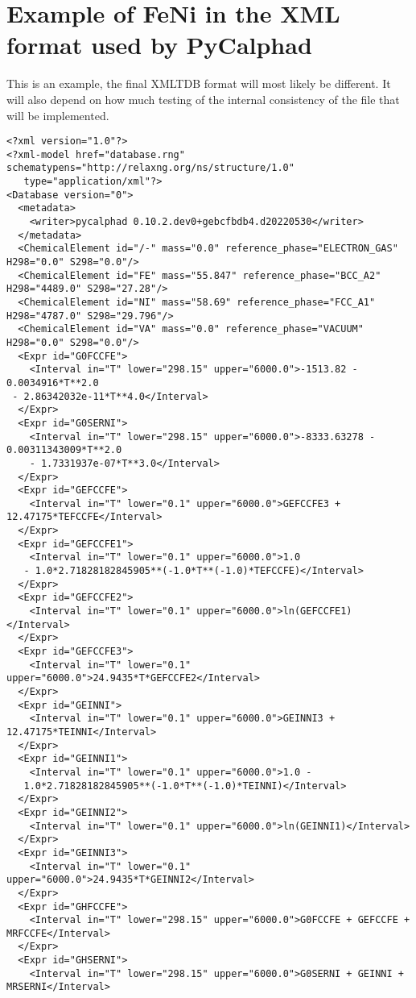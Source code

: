 \documentclass[12pt]{article}
\begin{document}
\section{Example of FeNi in the XML format used by PyCalphad}\label{sc:fenixml}

This is an example, the final XMLTDB format will most likely be
different.  It will also depend on how much testing of the internal
consistency of the file that will be implemented.

{\small
\begin{verbatim}
<?xml version="1.0"?>
<?xml-model href="database.rng" schematypens="http://relaxng.org/ns/structure/1.0"
   type="application/xml"?>
<Database version="0">
  <metadata>
    <writer>pycalphad 0.10.2.dev0+gebcfbdb4.d20220530</writer>
  </metadata>
  <ChemicalElement id="/-" mass="0.0" reference_phase="ELECTRON_GAS" H298="0.0" S298="0.0"/>
  <ChemicalElement id="FE" mass="55.847" reference_phase="BCC_A2" H298="4489.0" S298="27.28"/>
  <ChemicalElement id="NI" mass="58.69" reference_phase="FCC_A1" H298="4787.0" S298="29.796"/>
  <ChemicalElement id="VA" mass="0.0" reference_phase="VACUUM" H298="0.0" S298="0.0"/>
  <Expr id="G0FCCFE">
    <Interval in="T" lower="298.15" upper="6000.0">-1513.82 - 0.0034916*T**2.0
 - 2.86342032e-11*T**4.0</Interval>
  </Expr>
  <Expr id="G0SERNI">
    <Interval in="T" lower="298.15" upper="6000.0">-8333.63278 - 0.00311343009*T**2.0 
    - 1.7331937e-07*T**3.0</Interval>
  </Expr>
  <Expr id="GEFCCFE">
    <Interval in="T" lower="0.1" upper="6000.0">GEFCCFE3 + 12.47175*TEFCCFE</Interval>
  </Expr>
  <Expr id="GEFCCFE1">
    <Interval in="T" lower="0.1" upper="6000.0">1.0 
   - 1.0*2.71828182845905**(-1.0*T**(-1.0)*TEFCCFE)</Interval>
  </Expr>
  <Expr id="GEFCCFE2">
    <Interval in="T" lower="0.1" upper="6000.0">ln(GEFCCFE1)</Interval>
  </Expr>
  <Expr id="GEFCCFE3">
    <Interval in="T" lower="0.1" upper="6000.0">24.9435*T*GEFCCFE2</Interval>
  </Expr>
  <Expr id="GEINNI">
    <Interval in="T" lower="0.1" upper="6000.0">GEINNI3 + 12.47175*TEINNI</Interval>
  </Expr>
  <Expr id="GEINNI1">
    <Interval in="T" lower="0.1" upper="6000.0">1.0 - 
   1.0*2.71828182845905**(-1.0*T**(-1.0)*TEINNI)</Interval>
  </Expr>
  <Expr id="GEINNI2">
    <Interval in="T" lower="0.1" upper="6000.0">ln(GEINNI1)</Interval>
  </Expr>
  <Expr id="GEINNI3">
    <Interval in="T" lower="0.1" upper="6000.0">24.9435*T*GEINNI2</Interval>
  </Expr>
  <Expr id="GHFCCFE">
    <Interval in="T" lower="298.15" upper="6000.0">G0FCCFE + GEFCCFE + MRFCCFE</Interval>
  </Expr>
  <Expr id="GHSERNI">
    <Interval in="T" lower="298.15" upper="6000.0">G0SERNI + GEINNI + MRSERNI</Interval>

\end{verbatim}}
\end{document}
